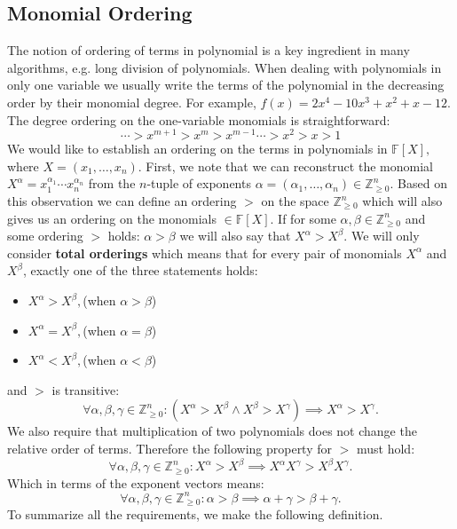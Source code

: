 \documentclass[thesis=M,english]{FITthesis}[2012/10/20]
\theoremstyle{remark}
\theoremstyle{definition}
\begin{document}
\subsection{Monomial Ordering}
\noindent The notion of ordering of terms in polynomial is a key ingredient in many algorithms, e.g. long division of polynomials. When dealing with polynomials in only one variable we usually write the terms of the polynomial in the decreasing order by their monomial degree. For example, $f(x) = 2x^4 - 10x^3 + x^2 + x -12$. The degree ordering on the one-variable monomials is straightforward:
$$
\cdots > x^{m+1} > x^m > x^{m-1} \cdots > x^2 > x > 1
$$
We would like to establish an ordering on the terms in polynomials in $\mathbb{F}[X],$ where $X = (x_1, \ldots, x_n)$. First, we note that we can reconstruct the monomial $X^{\alpha} = x_1^{\alpha_1}\cdots x_n^{\alpha_n}$ from the $n$-tuple of exponents $\alpha = (\alpha_1,\ldots, \alpha_n) \in \mathbb{Z}_{\geq 0}^n.$ Based on this observation we can define an ordering $>$ on the space $\mathbb{Z}_{\geq 0}^n$ which will also gives us an ordering on the monomials $\in \mathbb{F}[X].$ If for some $\alpha, \beta \in  \mathbb{Z}_{\geq 0}^n$ and some ordering $>$ holds: $\alpha > \beta$ we will also say that $X^\alpha > X^\beta.$ We will only consider \textbf{total orderings} which means that for every pair of monomials $X^\alpha$ and $X^\beta$, exactly one of the three statements holds:
\begin{itemize}
\item $X^\alpha > X^\beta,$\hfill (when $\alpha > \beta$)
\item $X^\alpha = X^\beta,$\hfill (when $\alpha = \beta$)
\item $X^\alpha < X^\beta,$\hfill (when $\alpha < \beta$)
\end{itemize}
\noindent and $>$ is transitive:
$$
\forall \alpha, \beta, \gamma \in \mathbb{Z}_{\geq 0}^n: (X^\alpha > X^\beta \land X^\beta > X^\gamma) \implies X^\alpha > X^\gamma.
$$
\noindent We also require that multiplication of two polynomials does not change the relative order of terms. Therefore the following property for $>$ must hold:
$$
\forall \alpha, \beta, \gamma \in \mathbb{Z}_{\geq 0}^n: X^\alpha > X^\beta \implies X^\alpha X^\gamma > X^\beta X^\gamma.
$$
\noindent Which in terms of the exponent vectors means: 
$$
\forall \alpha, \beta, \gamma \in \mathbb{Z}_{\geq 0}^n: \alpha > \beta \implies \alpha + \gamma > \beta + \gamma.
$$
\noindent To summarize all the requirements, we make the following definition.
\end{document}
